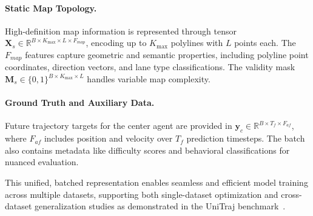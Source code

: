 \paragraph{Static Map Topology.}
High-definition map information is represented through tensor \(\boldsymbol{X}_s \in \mathbb{R}^{B \times K_{\max} \times L \times F_{map}}\), encoding up to \(K_{\max}\) polylines with \(L\) points each. The \(F_{map}\) features capture geometric and semantic properties, including polyline point coordinates, direction vectors, and lane type classifications. The validity mask \(\boldsymbol{M}_s \in \{0,1\}^{B \times K_{\max} \times L}\) handles variable map complexity.

\paragraph{Ground Truth and Auxiliary Data.}
Future trajectory targets for the center agent are provided in \(\boldsymbol{y}_c \in \mathbb{R}^{B \times T_f \times F_{af}}\), where \(F_{af}\) includes position and velocity over \(T_f\) prediction timesteps. The batch also contains metadata like difficulty scores and behavioral classifications for nuanced evaluation.

This unified, batched representation enables seamless and efficient model training across multiple datasets, supporting both single-dataset optimization and cross-dataset generalization studies as demonstrated in the UniTraj benchmark~\cite{unitrajFeng2024}.

\newpage